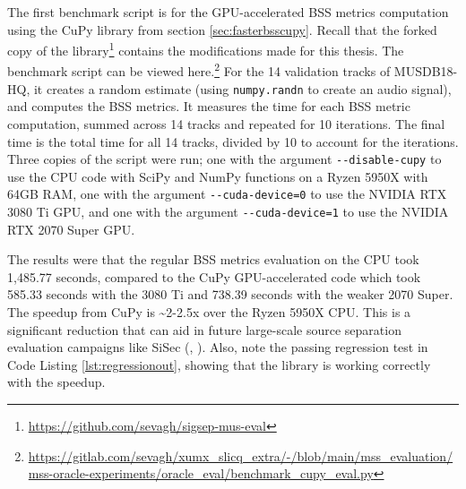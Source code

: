 \documentclass[report.tex]{subfiles}
\begin{document}
The first benchmark script is for the GPU-accelerated BSS metrics computation using the CuPy library from section \ref{sec:fasterbsscupy}. Recall that the forked copy of the library\footnote{\url{https://github.com/sevagh/sigsep-mus-eval}} contains the modifications made for this thesis. The benchmark script can be viewed here.\footnote{\url{https://gitlab.com/sevagh/xumx_slicq_extra/-/blob/main/mss_evaluation/mss-oracle-experiments/oracle_eval/benchmark_cupy_eval.py}} For the 14 validation tracks of MUSDB18-HQ, it creates a random estimate (using \Verb#numpy.randn# to create an audio signal), and computes the BSS metrics. It measures the time for each BSS metric computation, summed across 14 tracks and repeated for 10 iterations. The final time is the total time for all 14 tracks, divided by 10 to account for the iterations. Three copies of the script were run; one with the argument \Verb#--disable-cupy# to use the CPU code with SciPy and NumPy functions on a Ryzen 5950X with 64GB RAM, one with the argument \Verb#--cuda-device=0# to use the NVIDIA RTX 3080 Ti GPU, and one with the argument \Verb#--cuda-device=1# to use the NVIDIA RTX 2070 Super GPU.

The results were that the regular BSS metrics evaluation on the CPU took 1,485.77 seconds, compared to the CuPy GPU-accelerated code which took 585.33 seconds with the 3080 Ti and 738.39 seconds with the weaker 2070 Super. The speedup from CuPy is \textasciitilde 2-2.5x over the Ryzen 5950X CPU. This is a significant reduction that can aid in future large-scale source separation evaluation campaigns like SiSec (\cite{sisec2016}, \cite{sisec2018}). Also, note the passing regression test in Code Listing \ref{lst:regressionout}, showing that the library is working correctly with the speedup.
\end{document}
